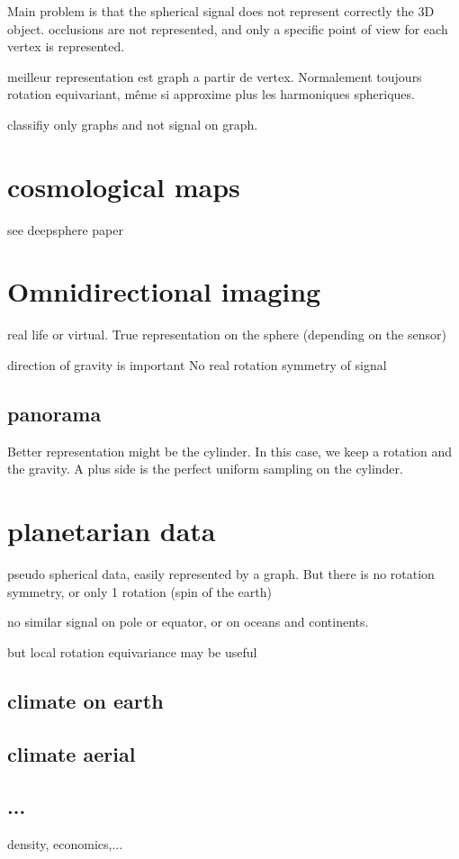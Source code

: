 \documentclass[11pt]{report}
\begin{document}
Main problem is that the spherical signal does not represent correctly the 3D object. occlusions are not represented, and only a specific point of view for each vertex is represented.

meilleur representation est graph a partir de vertex. Normalement toujours rotation equivariant, même si approxime plus les harmoniques spheriques.

classifiy only graphs and not signal on graph.

\section{cosmological maps}
see deepsphere paper

\section{Omnidirectional imaging}
real life or virtual.
True representation on the sphere (depending on the sensor)

direction of gravity is important
No real rotation symmetry of signal
\subsection{panorama}
Better representation might be the cylinder. In this case, we keep a rotation and the gravity. A plus side is the perfect uniform sampling on the cylinder.
\section{planetarian data}
pseudo spherical data, easily represented by a graph.
But there is no rotation symmetry, or only 1 rotation (spin of the earth)

no similar signal on pole or equator, or on oceans and continents.

but local rotation equivariance may be useful
\subsection{climate on earth}
\subsection{climate aerial}
\subsection{...}
density, economics,...
\end{document}
